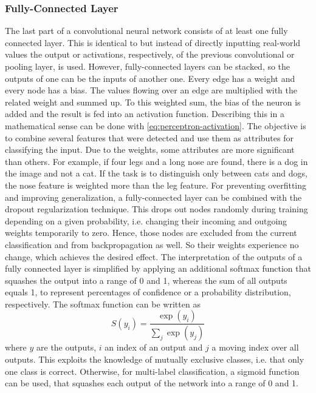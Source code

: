 \subsubsection{Fully-Connected Layer}
\label{sec:cnn-fully-connected}
The last part of a convolutional neural network consists of at least one fully connected layer.
This is identical to  but instead of directly inputting real-world values the output or activations, respectively, of the previous convolutional or pooling layer, is used.
However, fully-connected layers can be stacked, so the outputs of one can be the inputs of another one.
Every edge has a weight and every node has a bias.
The values flowing over an edge are multiplied with the related weight and summed up.
To this weighted sum, the bias of the neuron is added and the result is fed into an activation function.
Describing this in a mathematical sense can be done with \eqref{eq:perceptron-activation}.
The objective is to combine several features that were detected and use them as attributes for classifying the input.
Due to the weights, some attributes are more significant than others.
For example, if four legs and a long nose are found, there is a dog in the image and not a cat.
If the task is to distinguish only between cats and dogs, the nose feature is weighted more than the leg feature.
For preventing overfitting and improving generalization, a fully-connected layer can be combined with the dropout regularization technique\cite{Srivastava:2014:DSW:2627435.2670313}.
This drops out nodes randomly during training depending on a given probability, i.e. changing their incoming and outgoing weights temporarily to zero.
Hence, those nodes are excluded from the current classification and from backpropagation as well.
So their weights experience no change, which achieves the desired effect.
The interpretation of the outputs of a fully connected layer is simplified by applying an additional softmax function that squashes the output into a range of 0 and 1, whereas the sum of all outputs equals 1, to represent percentages of confidence or a probability distribution, respectively\cite{Bishop2006}.
The softmax function can be written as
\begin{equation}
	\label{eq:softmax}
	S(y_i) = \frac{\exp(y_i)}{\sum_{j} \exp(y_j)}
\end{equation}
where $y$ are the outputs, $i$ an index of an output and $j$ a moving index over all outputs.
This exploits the knowledge of mutually exclusive classes, i.e. that only one class is correct.
Otherwise, for multi-label classification, a sigmoid function can be used, that squashes each output of the network into a range of 0 and 1.